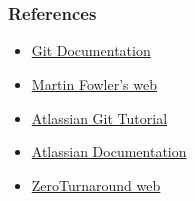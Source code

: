 
\section*{}
\begin{frame}
\frametitle{References}
\begin{itemize}
	\item \href{https://git-scm.com/documentation}{Git Documentation}
	\item \href{https://martinfowler.com}{Martin Fowler’s web}
	\item \href{https://www.atlassian.com/git/tutorials}{Atlassian Git Tutorial}
	\item \href{https://www.atlassian.com/continuous-delivery}{Atlassian Documentation}
	\item \href{https://zeroturnaround.com/rebellabs/java-build-tools-part-2-a-decision-makers-comparison-of-maven-gradle-and-ant-ivy/}{ZeroTurnaround web}
\end{itemize}
\end{frame}



